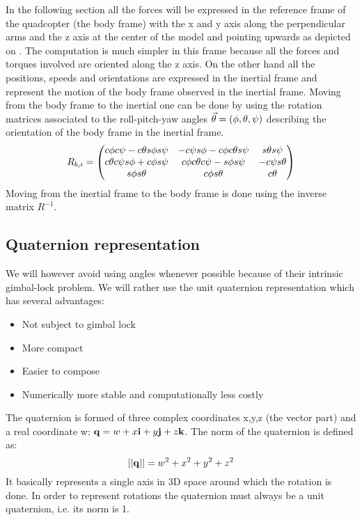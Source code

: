 In the following section all the forces will be expressed in the reference frame
of the quadcopter (the body frame) with the x and y axis along the perpendicular
arms and the z axis at the center of the model and pointing upwards as depicted
on . The computation is much simpler in this frame because all the
forces and torques involved are oriented along the z axis. On the other hand all
the positions, speeds and orientations are expressed in the inertial frame and
represent the motion of the body frame observed in the inertial frame. Moving
from the body frame to the inertial one can be done by using the rotation
matrices associated to the roll-pitch-yaw angles $\vec{\theta} =
(\phi,\theta,\psi)$ describing the orientation of the body frame in the inertial frame.
\begin{equation}
	R_{b,i} = \begin{pmatrix}
	c\phi c\psi - c\theta s\phi s\psi & -c\psi s\phi - c\phi c\theta s\psi &
	s\theta s\psi\\
	c\theta c\psi s\phi+c\phi s\psi & c\phi c\theta c\psi-s\phi s\psi &
	-c\psi s\theta\\
	s\phi s\theta & c\phi s\theta & c\theta
	\end{pmatrix}
\end{equation}
Moving from the inertial frame to the body frame is done using the inverse
matrix $R^{-1}$.

\subsection{Quaternion representation}
We will however avoid using angles whenever possible because of their intrinsic
gimbal-lock problem. We will rather use the
unit quaternion representation which has several advantages:
\begin{itemize}
  \item Not subject to gimbal lock
  \item More compact
  \item Easier to compose
  \item Numerically more stable and computationally less costly
\end{itemize}
The quaternion is formed of three complex coordinates x,y,z (the
vector part) and a real coordinate w: $\mathbf{q} = w + x\mathbf{i} + y\mathbf{j} +
z\mathbf{k}$. The norm of the quaternion is defined as:
\begin{equation}
	||\mathbf{q}|| = w^2 + x^2 + y^2 + z^2
\end{equation}
It basically represents a
single axis in 3D space around which the rotation is done. In order to represent rotations the quaternion must
always be a unit quaternion, i.e. its norm is 1.

